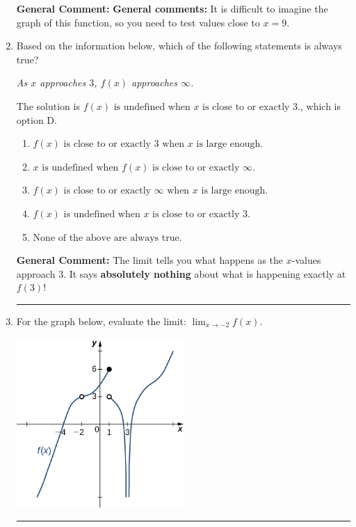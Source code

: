\documentclass{extbook}[14pt]
\newcommand{\litem}[1]{\item #1

\rule{\textwidth}{0.4pt}}
\begin{document}
\begin{enumerate}
{\textbf{General Comment:} \textbf{General comments:} It is difficult to imagine the graph of this function, so you need to test values close to $x = 9$.
}
\litem{
Based on the information below, which of the following statements is always true?

\begin{center}
    \textit{ As $x$ approaches $3$, $f(x)$ approaches $\infty$. }
\end{center}
The solution is \( f(x) \text{ is undefined when } x \text{ is close to or exactly } 3. \), which is option D.\begin{enumerate}[label=\Alph*.]
\item \( f(x) \text{ is close to or exactly } 3 \text{ when } x \text{ is large enough}. \)


\item \( x \text{ is undefined when } f(x) \text{ is close to or exactly } \infty. \)


\item \( f(x) \text{ is close to or exactly } \infty \text{ when } x \text{ is large enough}. \)


\item \( f(x) \text{ is undefined when } x \text{ is close to or exactly } 3. \)


\item \( \text{None of the above are always true.} \)


\end{enumerate}

\textbf{General Comment:} The limit tells you what happens as the $x$-values approach $3$. It says \textbf{absolutely nothing} about what is happening exactly at $f(3)$!
}
\litem{
For the graph below, evaluate the limit: $ \displaystyle \lim_{x \rightarrow -2} f(x)$.

\begin{center}
    \includegraphics[width=0.5\textwidth]{../Figures/evaluateLimitGraphicallyC.png}
\end{center}


}
\end{enumerate}
\end{document}
